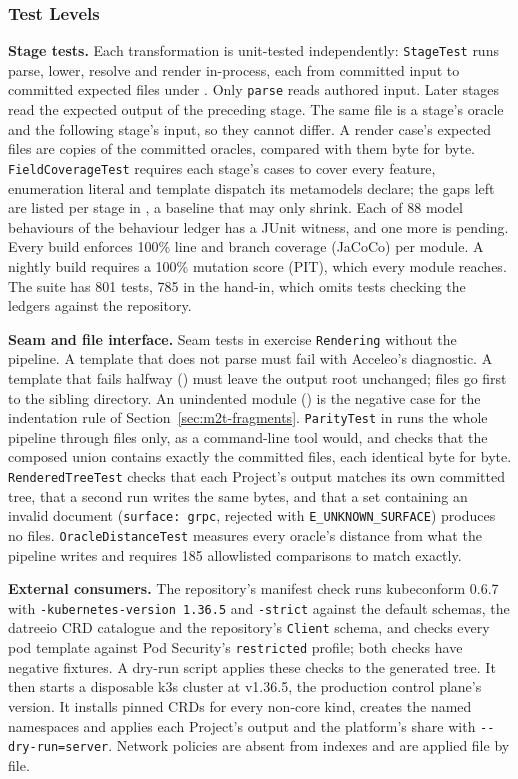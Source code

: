 \subsubsection{Test Levels}
\label{sec:levels}

\textbf{Stage tests.} Each transformation is unit-tested independently: \texttt{StageTest}
runs parse, lower, resolve and render in-process, each from committed input to
committed expected files under .
Only \texttt{parse} reads authored input. Later stages read the expected output of
the preceding stage. The same file is a stage's oracle and the following stage's
input, so they cannot differ. A render case's expected files are copies of the committed
oracles, compared with them byte for byte. \texttt{FieldCoverageTest} requires each
stage's cases to cover every feature, enumeration literal and template dispatch its
metamodels declare; the gaps left are listed per stage in , a baseline that may only shrink.
Each of 88 model behaviours of the behaviour ledger has a JUnit witness, and one
more is pending. Every build enforces 100\% line and
branch coverage (JaCoCo) per module. A nightly build requires a 100\% mutation score (PIT), which every module reaches. The suite has
801 tests, 785 in the hand-in, which omits tests checking the ledgers against the repository.

\textbf{Seam and file interface.} Seam tests in  exercise
\texttt{Rendering} without the pipeline. A template that does not parse must fail with Acceleo's diagnostic. A template that fails halfway () must leave the output root unchanged; files go first to the sibling  directory. An unindented module
() is the negative case for the indentation rule of
Section~\ref{sec:m2t-fragments}.
\texttt{ParityTest} in  runs the whole pipeline through
files only, as a command-line tool would, and checks that
the composed union contains exactly the committed files, each identical byte for byte.
\texttt{RenderedTreeTest} checks that each Project's output matches its own committed
tree, that a second run writes the same bytes, and that a set containing an invalid
document (\texttt{surface: grpc}, rejected with \texttt{E\_UNKNOWN\_SURFACE}) produces no
files. \texttt{OracleDistanceTest} measures every oracle's distance from what the
pipeline writes and requires 185 allowlisted comparisons to match exactly.

\textbf{External consumers.} The repository's manifest check runs kubeconform 0.6.7 with
\texttt{-kubernetes-version 1.36.5} and \texttt{-strict} against the default
schemas, the datreeio CRD catalogue and the repository's \texttt{Client} schema,
and checks every pod template against Pod Security's \texttt{restricted} profile;
both checks have negative fixtures. A dry-run script applies these checks to the generated tree. It then starts a disposable k3s cluster at v1.36.5, the production control plane's version. It installs pinned CRDs for every non-core kind, creates the named namespaces and applies each Project's output and the platform's share with \texttt{-{}-dry-run=server}. Network policies are absent from indexes and are applied file by file.

